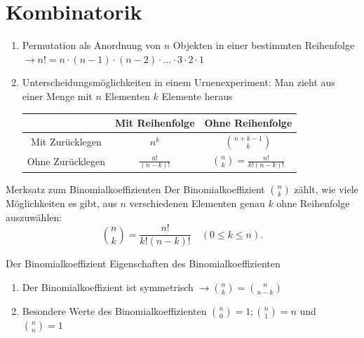     \section{Kombinatorik}
\begin{enumerate}
    \item Permutation als  Anordnung von $n$ Objekten in einer bestimmten Reihenfolge $\longrightarrow n! = n\cdot ( n-1) \cdot (n-2)\cdot \ldots \cdot 3\cdot  2\cdot 1$
    \item Unterscheidungsmöglichkeiten in einem Urnenexperiment: Man zieht aus einer Menge mit $n$ Elementen $k$ Elemente heraus\\
    \begin{center}
   \begin{tabular}{|c||c|c|}
    \hline
         &  Mit Reihenfolge & Ohne Reihenfolge\\
           \hline\hline
     Mit Zurücklegen   & $n^k$ & $\binom{n+k-1}{k}$\\
     \hline
     Ohne Zurücklegen & $\frac{n!}{\left(n-k\right)!}$& $\binom{n}{k} = \frac{n!}{k!\left(n-k\right)!}$\\
     \hline
    \end{tabular} 
         
    \end{center}
\end{enumerate}
\begin{merke}{Merksatz zum Binomialkoeffizienten}{}
Der Binomialkoeffizient \(\binom{n}{k}\) zählt, wie viele Möglichkeiten es gibt, aus \(n\) verschiedenen Elementen genau \(k\) ohne Reihenfolge auszuwählen:
\[\binom{n}{k}=\frac{n!}{k!(n-k)!}\quad (0\le k\le n).\]
\end{merke}
\begin{b8d}{Der Binomialkoeffizient}{}
Eigenschaften des Binomialkoeffizienten
\begin{enumerate}
    \item Der Binomialkoeffizient ist symmetrisch $\longrightarrow \binom{n}{k} = \binom{n}{n-k}$
    \item Besondere Werte des Binomialkoeffizienten $\binom{n}{0}= 1; \binom{n}{1} = n$ und $\binom{n}{n}=1$
\end{enumerate}  
\end{b8d}
